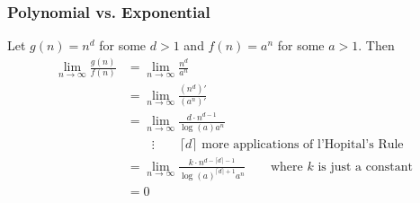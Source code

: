 \documentclass[paper=a4, fontsize=11pt]{scrartcl} %
\numberwithin{equation}{section} %
\numberwithin{figure}{section} %
\numberwithin{table}{section} %
\begin{document}
\subsubsection*{Polynomial vs. Exponential}
Let $g(n)=n^d$ for some $ d > 1$ and $f(n) = a^n$ for some $a>1$. Then
\begin{align*}
\lim_{n \to \infty} \frac{g(n)}{f(n)} &= \lim_{n \to \infty} \frac{n^d}{a^n} \\
	&= \lim_{n \to \infty} \frac{(n^d)'}{(a^n)'} \\
	&= \lim_{n \to \infty} \frac{d \cdot n^{d-1}}{\log(a) a^{n}} \\
	& \qquad{}  \vdots \qquad{} \lceil d \rceil \textrm{ more applications of l'Hopital's Rule} \\
	&= \lim_{n \to \infty} \frac{k\cdot n^{d - \lceil d \rceil - 1}}{\log(a)^{\lceil d \rceil+1}a^{n}} \qquad{} \textrm{where } k \textrm{ is just a constant} \\
	&= 0	
\end{align*}

\end{document}
